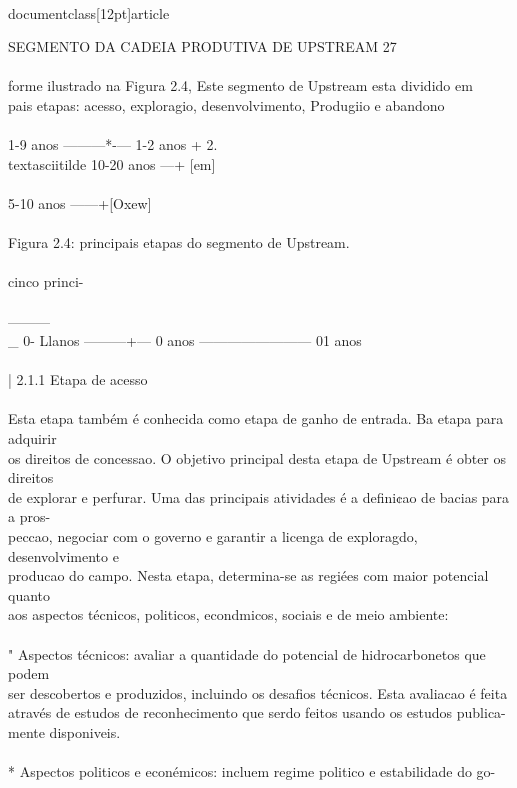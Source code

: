 \\documentclass[12pt]{article}
\begin{document}
SEGMENTO DA CADEIA PRODUTIVA DE UPSTREAM 27\\
\\
forme ilustrado na Figura 2.4, Este segmento de Upstream esta dividido em\\
pais etapas: acesso, exploragio, desenvolvimento, Produgiio e abandono\\
\\
1-9 anos ———*-— 1-2 anos + 2.\\textasciitilde{} 10-20 anos —+ [em]\\
\\
5-10 anos ——+[Oxew]\\
\\
Figura 2.4: principais etapas do segmento de Upstream.\\
\\
cinco princi-\\
\\
———\\_ 0- Llanos ———+— 0 anos ———————— 01 anos\\
\\
| 2.1.1 Etapa de acesso\\
\\
Esta etapa também é conhecida como etapa de ganho de entrada. Ba etapa para adquirir\\
os direitos de concessao. O objetivo principal desta etapa de Upstream é obter os direitos\\
de explorar e perfurar. Uma das principais atividades é a defini¢ao de bacias para a pros-\\
peccao, negociar com o governo e garantir a licenga de exploragdo, desenvolvimento e\\
producao do campo. Nesta etapa, determina-se as regiées com maior potencial quanto\\
aos aspectos técnicos, politicos, econdmicos, sociais e de meio ambiente:\\
\\
" Aspectos técnicos: avaliar a quantidade do potencial de hidrocarbonetos que podem\\
ser descobertos e produzidos, incluindo os desafios técnicos. Esta avaliacao é feita\\
através de estudos de reconhecimento que serdo feitos usando os estudos publica-\\
mente disponiveis.\\
\\
* Aspectos politicos e econémicos: incluem regime politico e estabilidade do go-\\
\end{document}
